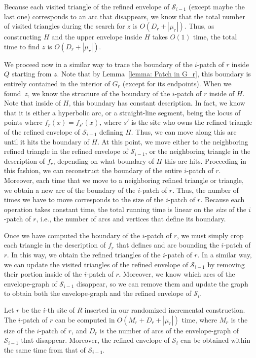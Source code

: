 \documentclass[a4paper,UKenglish]{socg-lipics-v2018}
\newcommand{\icell}[1][i]{${#1}$-patch\xspace}
\newcommand{\s}{\mathcal S}
\begin{document}
Because each visited triangle of the refined envelope of $\s_{i-1}$ (except maybe the last one) corresponds to an arc that disappears, we know that the total number of visited triangles during the search for $z$ is $O(D_r + |\mu_r|)$.
Thus, as constructing $H$ and the upper envelope inside $H$ takes $O(1)$ time, the total time to find $z$ is $O(D_r + |\mu_r|)$.

We proceed now in a similar way to trace the boundary of the \icell of $r$ inside $Q$ starting from $z$.
Note that by Lemma~\ref{lemma: Patch in G_r}, this boundary is entirely contained in the interior of $G_r$ (except for its endpoints). 
When we found~$z$, we know the structure of the boundary of the \icell of $r$ inside of $H$. 
Note that inside of $H$, this boundary has constant description. 
In fact, we know that it is either a hyperbolic arc, or a straight-line segment, being the locus of points where $f_r(x) = f_{s'}(x)$, where $s'$ is the site who owns the refined triangle of the refined envelope of $\s_{i-1}$ defining $H$.
Thus, we can move along this arc until it hits the boundary of $H$. 
At this point, we move either to the neighboring refined triangle in the refined envelope of $\s_{i-1}$, or the neighboring triangle in the description of $f_r$, 
depending on what boundary of $H$ this arc hits. 
Proceeding in this fashion, we can reconstruct the boundary of the entire \icell of $r$. 
Moreover, each time that we move to a neighboring refined triangle or triangle, we obtain a new arc of the boundary of the \icell of $r$. 
Thus, the number of times we have to move corresponds to the size of the \icell of $r$. 
Because each operation takes constant time, the total running time is linear on the \emph{size} of the \icell of $r$, i.e., the number of arcs and vertices that define its boundary.

Once we have computed the boundary of the \icell of $r$, we must simply crop each triangle in the description of $f_r$ that defines and arc bounding the \icell of $r$. 
In this way, we obtain the refined triangles of the \icell of $r$.
In a similar way, we can update the visited triangles of the refined envelope of $\s_{i-1}$ by removing their portion inside of the \icell of $r$.
Moreover, we know which arcs of the envelope-graph of $\s_{i-1}$ disappear, so we can remove them and update the graph to obtain both the envelope-graph and the refined envelope of $\s_i$. 


\begin{lemma}\label{lemma:Time to insert one site of R}
Let $r$ be the $i$-th site of $R$ inserted in our randomized incremental construction. 
The \icell of $r$ can be computed in $O(M_r + D_r + |\mu_r|)$ time, where $M_r$ is the size of the \icell of $r$, and $D_r$ is the number of arcs of the envelope-graph of $\s_{i-1}$ that disappear.
Moreover, the refined envelope of $\s_i$ can be obtained within the same time from that of $\s_{i-1}$.
\end{lemma}
\end{document}
